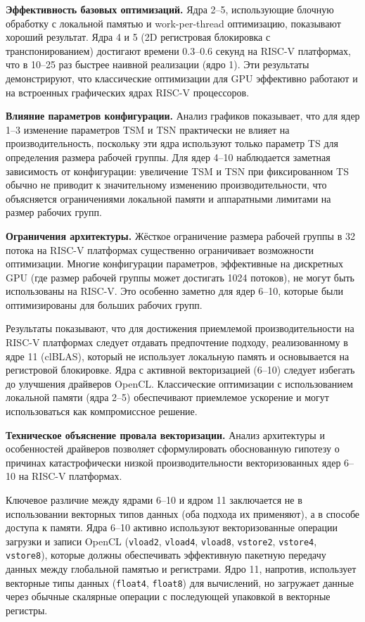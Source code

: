 \textbf{Эффективность базовых оптимизаций.} Ядра 2--5, использующие блочную обработку с локальной памятью и work-per-thread оптимизацию, показывают хороший результат. Ядра 4 и 5 (2D регистровая блокировка с транспонированием) достигают времени 0.3--0.6 секунд на RISC-V платформах, что в 10--25 раз быстрее наивной реализации (ядро 1). Эти результаты демонстрируют, что классические оптимизации для GPU эффективно работают и на встроенных графических ядрах RISC-V процессоров.

\textbf{Влияние параметров конфигурации.} Анализ графиков показывает, что для ядер 1--3 изменение параметров TSM и TSN практически не влияет на производительность, поскольку эти ядра используют только параметр TS для определения размера рабочей группы. Для ядер 4--10 наблюдается заметная зависимость от конфигурации: увеличение TSM и TSN при фиксированном TS обычно не приводит к значительному изменению производительности, что объясняется ограничениями локальной памяти и аппаратными лимитами на размер рабочих групп.

\textbf{Ограничения архитектуры.} Жёсткое ограничение размера рабочей группы в 32 потока на RISC-V платформах существенно ограничивает возможности оптимизации. Многие конфигурации параметров, эффективные на дискретных GPU (где размер рабочей группы может достигать 1024 потоков), не могут быть использованы на RISC-V. Это особенно заметно для ядер 6--10, которые были оптимизированы для больших рабочих групп.

Результаты показывают, что для достижения приемлемой производительности на RISC-V платформах следует отдавать предпочтение подходу, реализованному в ядре 11 (clBLAS), который не использует локальную память и основывается на регистровой блокировке. Ядра с активной векторизацией (6--10) следует избегать до улучшения драйверов OpenCL. Классические оптимизации с использованием локальной памяти (ядра 2--5) обеспечивают приемлемое ускорение и могут использоваться как компромиссное решение.

\textbf{Техническое объяснение провала векторизации.} Анализ архитектуры и особенностей драйверов позволяет сформулировать обоснованную гипотезу о причинах катастрофически низкой производительности векторизованных ядер 6--10 на RISC-V платформах.

Ключевое различие между ядрами 6--10 и ядром 11 заключается не в использовании векторных типов данных (оба подхода их применяют), а в способе доступа к памяти. Ядра 6--10 активно используют векторизованные операции загрузки и записи OpenCL (\texttt{vload2}, \texttt{vload4}, \texttt{vload8}, \texttt{vstore2}, \texttt{vstore4}, \texttt{vstore8}), которые должны обеспечивать эффективную пакетную передачу данных между глобальной памятью и регистрами. Ядро 11, напротив, использует векторные типы данных (\texttt{float4}, \texttt{float8}) для вычислений, но загружает данные через обычные скалярные операции с последующей упаковкой в векторные регистры.

